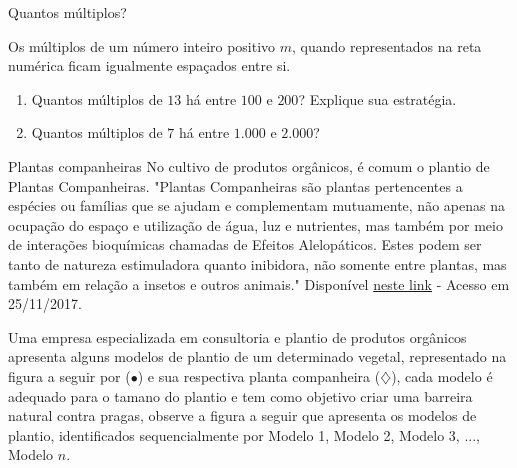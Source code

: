 \begin{task}{Quantos múltiplos?}

Os múltiplos de um número inteiro positivo $m$, quando representados na reta numérica ficam igualmente espaçados entre si.
\begin{enumerate}
\item Quantos múltiplos de $13$ há entre $100$ e $200$? Explique sua estratégia.
\item Quantos múltiplos de $7$ há entre $1.000$ e $2.000$?
\end{enumerate}
\end{task}

\begin{task}{Plantas companheiras}
No cultivo de produtos orgânicos, é comum o plantio de Plantas Companheiras. "Plantas Companheiras são plantas pertencentes a espécies ou famílias que se ajudam e complementam mutuamente, não apenas na ocupação do espaço e utilização de água, luz e nutrientes, mas também por meio de interações bioquímicas chamadas de Efeitos Alelopáticos. Estes podem ser tanto de natureza estimuladora quanto inibidora, não somente entre plantas, mas também em relação a insetos e outros animais." Disponível \href{https://permacoletivo.files.wordpress.com/2008/06/manual-horta-organica-domestica.pdf}{neste link} - Acesso em 25/11/2017.

Uma empresa especializada em consultoria e plantio de produtos orgânicos apresenta alguns modelos de plantio de um determinado vegetal, representado na figura a seguir por ({\Large $\bullet$}) e sua respectiva planta companheira ({\Large$\diamondsuit$}), cada modelo é adequado para o tamano do plantio e tem como objetivo criar uma barreira natural contra pragas, observe a figura a seguir que apresenta os modelos de plantio, identificados sequencialmente por Modelo 1, Modelo 2, Modelo 3, ..., Modelo $n$.


\begin{figure}[H]
\centering

\end{figure}
\end{task}
